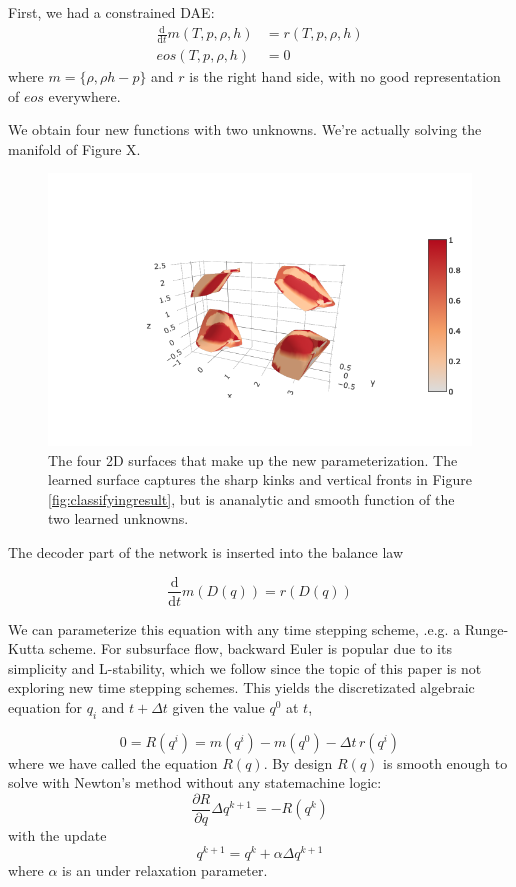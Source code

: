 \documentclass[]{article}
\begin{document}
First, we had a constrained DAE:
\begin{align}
\frac{\mathrm{d}}{\mathrm{d}t} m(T,p,\rho,h) &= r(T,p,\rho,h)\\
eos(T,p,\rho,h) &= 0
\end{align}
where $m=\{\rho,\rho h -p\}$ and $r$ is the right hand side, with no good representation of \(eos\) everywhere.

We obtain four new functions with two unknowns. We're actually solving the manifold of Figure X.
\begin{figure}
  \centering
  \includegraphics{../slides/water_four_surfaces_plot.png}
  \caption{\label{fig:foursurfaces}The four 2D surfaces that make up the new parameterization. The learned surface captures the sharp kinks and vertical fronts in Figure \ref{fig:classifyingresult}, but is ananalytic and smooth function of the two learned unknowns.}
  \end{figure}

The decoder part of the network is inserted into the balance law

\begin{equation}
\frac{\mathrm{d}}{\mathrm{d}t} m(D(q)) = r(D(q))
\end{equation}

We can parameterize this equation with any time stepping scheme, .e.g. a
Runge-Kutta scheme. For subsurface flow, backward Euler is popular due
to its simplicity and L-stability, which we follow since the topic of
this paper is not exploring new time stepping schemes. This yields the
discretizated algebraic equation for \(q_i\) and \(t+\Delta t\) given the
value \(q^0\) at \(t\),

\begin{equation}
0 = R(q^i) = m(q^{i}) - m(q^{0}) - \Delta t \, r(q^i)
\end{equation}
where we have called the equation \(R(q)\). By design \(R(q)\) is smooth
enough to solve with Newton's method without any statemachine logic:
\begin{equation}
\frac{\partial R}{\partial q} \Delta q^{k+1} = - R(q^k)
\end{equation}
with the update
\begin{equation}
q^{k+1} = q^k + \alpha\Delta q^{k+1}
\end{equation}
where $\alpha$ is an under relaxation parameter.
\end{document}
